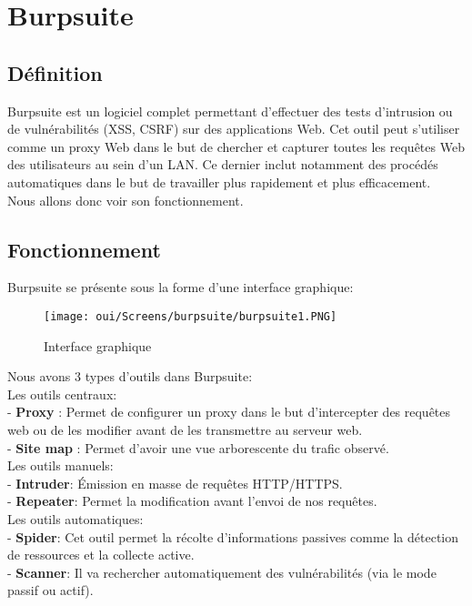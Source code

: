 \section{Burpsuite}

\subsection{Définition}

Burpsuite est un logiciel complet permettant d’effectuer des tests d’intrusion ou de vulnérabilités (XSS, CSRF) sur des applications Web. Cet outil peut s’utiliser comme un proxy Web dans le but de chercher  et capturer toutes les requêtes Web des utilisateurs au sein d’un LAN. Ce dernier inclut notamment des procédés automatiques dans le but de travailler plus rapidement et plus efficacement.\\
Nous allons donc voir son fonctionnement.

\subsection{Fonctionnement}

Burpsuite se présente sous la forme d’une interface graphique:

\begin{figure}[htp!]
  \centering
  \setlength\figureheight{7cm}
  \setlength\figurewidth{9cm}
  \texttt{[image: oui/Screens/burpsuite/burpsuite1.PNG]}
  \caption{Interface graphique}
  \label{fig:courbe-tikz}
\end{figure}

\noindent Nous avons 3 types d’outils dans Burpsuite:\\

\noindent Les outils centraux:\\
- \textbf{Proxy} : Permet de configurer un proxy dans le but d’intercepter des requêtes web ou de les modifier avant de les transmettre au serveur web.\\
- \textbf{Site map} : Permet d’avoir une vue arborescente du trafic observé.\\


\noindent Les outils manuels:\\
- \textbf{Intruder}: Émission en masse de requêtes HTTP/HTTPS.\\
- \textbf{Repeater}: Permet la modification avant l’envoi de nos requêtes.\\

\noindent Les outils automatiques:\\
- \textbf{Spider}: Cet outil permet la récolte d’informations passives comme la détection de ressources et la collecte active.\\
- \textbf{Scanner}: Il va rechercher automatiquement des vulnérabilités (via le mode passif ou actif).\\

